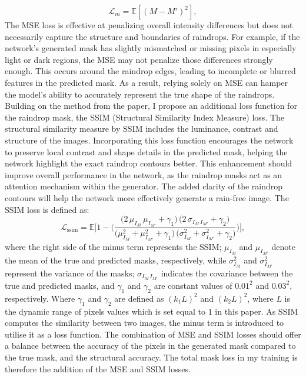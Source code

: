 \documentclass[11pt]{ociamthesis}  %
\begin{document}
\noindent
\begin{equation}
    \mathcal{L}_m = \mathbb{E}[(M - M')^2],
    \label{Eq:MSE}
\end{equation}
\noindent
The MSE loss is effective at penalizing overall intensity differences but does not necessarily capture the structure and boundaries of raindrops. For example, if the network’s generated mask has slightly mismatched or missing pixels in especially light or dark regions, the MSE may not penalize those differences strongly enough. This occurs around the raindrop edges, leading to incomplete or blurred features in the predicted mask. As a result, relying solely on MSE can hamper the model’s ability to accurately represent the true shape of the raindrops. Building on the method from the paper, I propose an additional loss function for the raindrop mask, the SSIM\cite{SSIM} (Structural Similarity Index Measure) loss. The structural similarity measure by SSIM includes the luminance, contrast and structure of the images. Incorporating this loss function encourages the network to preserve local contrast and shape details in the predicted mask, helping the network highlight the exact raindrop contours better. This enhancement should improve overall performance in the network, as the raindrop masks act as an attention mechanism within the generator. The added clarity of the raindrop contours will help the network more effectively generate a rain-free image. The SSIM loss is defined as:
\noindent
\begin{equation}
\mathcal{L}_{\text{ssim}} = \mathbb{E}\!\Bigg[
  1 - \Biggl(
    \frac{\bigl(2\,\mu_{I_M}\,\mu_{I_{M'}} + \gamma_1\bigr)\,\bigl(2\,\sigma_{I_M\,I_{M'}} + \gamma_2\bigr)}
         {\bigl(\mu_{I_M}^2 + \mu_{I_{M'}}^2 + \gamma_1\bigr)\,\bigl(\sigma_{I_M}^2 + \sigma_{I_{M'}}^2 + \gamma_2\bigr)}
  \Biggr)
\Bigg],
\label{Eq:SSIM}
\end{equation}
\noindent where the right side of the minus term represents the SSIM; $\mu_{I_M}$ \noindent and $\mu_{I_{M'}}$ denote the mean of the true and predicted masks, respectively, while $\sigma_{I_M}^2$ and $\sigma_{I_{M'}}^2$ represent the variance of the masks; \noindent $\sigma_{I_M\,I_{M'}}$ indicates the covariance between the true and predicted masks, and $\gamma_1$ and $\gamma_2$ are constant values of $0.01^2$ and $0.03^2$, respectively. Where $\gamma_1$ and $\gamma_2$ are defined as $(k_1L)^2$ and $(k_2L)^2$, where $L$ is the dynamic range of pixels values which is set equal to $1$ in this paper. As SSIM computes the similarity between two images, the minus term is introduced to utilise it as a loss function. The combination of MSE and SSIM losses should offer a balance between the accuracy of the pixels in the generated mask compared to the true mask, and the structural accuracy. The total mask loss in my training is therefore the addition of the MSE and SSIM losses.
\end{document}
